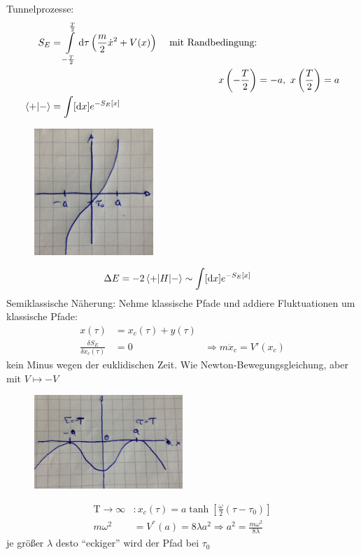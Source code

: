 Tunnelprozesse:
	\begin{align*}
		S_E &= \int \limits_{-\frac{T}{2}}^{\frac{T}{2}} \mathrm{d} \tau 
		\left(\frac{m}{2} \dot{x}^2 + V(x)\right) & \text{ mit Randbedingung:}&\\
		&&x \left(-\frac{T}{2}\right) &= -a ,~ x \left(\frac{T}{2}\right) = a \\
		\braket{+ | -} &= \int [\mathrm{d} x] e^{-S_E[x]}
	\end{align*}
	\begin{figure} [h]
		\begin{center}
			\includegraphics[width= 0.4\textwidth]{Tunneln_durch_eine_Potentialbarriere5}
		\end{center}
	\end{figure}
	\begin{align*}
		\Delta E &= -2 \braket{+ | H | -} \sim \int [\mathrm{d} x] e^{-S_E[x]}
	\end{align*}
Semiklassische Näherung: Nehme klassische Pfade und addiere Fluktuationen um klassische Pfade: 
	\begin{align*}
		x(\tau) &= x_c(\tau) + y(\tau) \\
		\frac{\delta S_E}{\delta x_c(\tau)} &= 0
		&\Rightarrow m \ddot{x}_c = V' (x_c) 
	\end{align*}
kein Minus wegen der euklidischen Zeit. Wie Newton-Bewegungsgleichung, aber mit $V \mapsto -V$
	\begin{figure} [h]
		\begin{center}
			\includegraphics[width= 0.5\textwidth]{Tunneln_durch_eine_Potentialbarriere6}
		\end{center}
	\end{figure}
	\begin{align*}
		\mathrm{T} \rightarrow \infty &: 
		x_c(\tau) = a \tanh \left[\frac{\omega}{2} (\tau- \tau_0)\right] \\
		m \omega^2 &= V^{''}(a) = 8 \lambda a^2
		\Rightarrow a^2 = \frac{m \omega^2}{8 \lambda}
	\end{align*}
je größer $\lambda$ desto ``eckiger'' wird der Pfad bei $\tau_0$ 
\\

